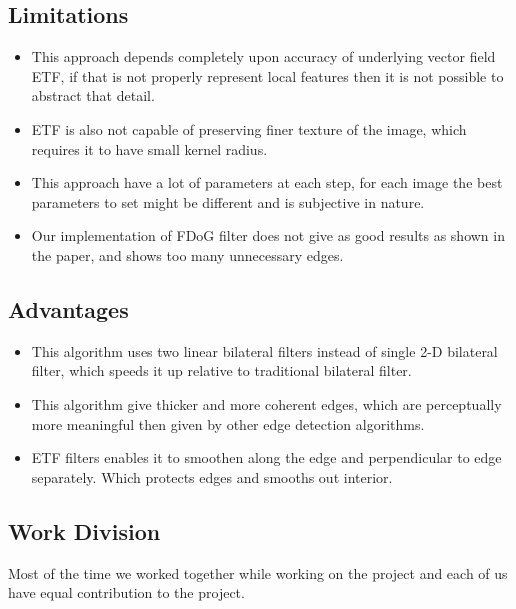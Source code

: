 \documentclass[a4paper]{article}
\begin{document}
\newpage
\subsection{Limitations}
\begin{itemize}
\item This approach depends completely upon accuracy of underlying vector field ETF, if that is not properly represent local features then it is not possible to abstract that detail. 
\item ETF is also not capable of preserving finer texture of the image, which requires it to have small kernel radius.
\item This approach have a lot of parameters at each step, for each image the best parameters to set might be different and is subjective in nature.
\item Our implementation of FDoG filter does not give as good results as shown in the paper, and shows too many unnecessary edges.
\end{itemize}

\subsection{Advantages}
\begin{itemize}
\item This algorithm uses two linear bilateral filters instead of single 2-D bilateral filter, which speeds it up relative to traditional bilateral filter.
\item This algorithm give thicker and more coherent edges, which are perceptually more meaningful then given by other edge detection algorithms.
\item ETF filters enables it to smoothen along the edge and perpendicular to edge separately. Which protects edges and smooths out interior.
\end{itemize}

\subsection{Work Division}
Most of the time we worked together while working on the project and each of us have equal contribution to the project.




\end{document}
